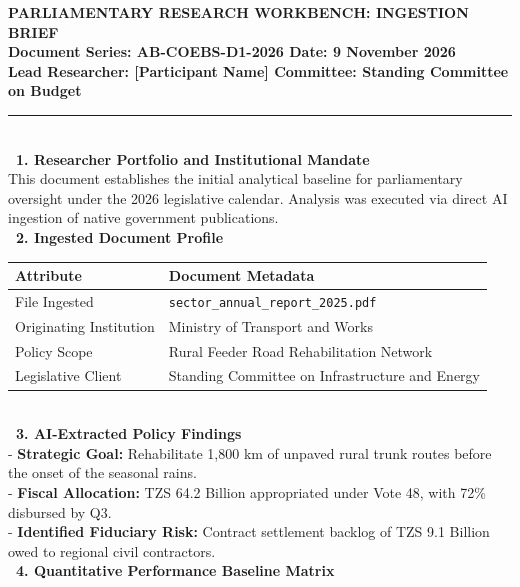 \documentclass[11pt, a4paper]{report}
\begin{document}
\begin{tcolorbox}[colback=lightgrey, colframe=bordergrey, title=\textbf{Deliverable 1 Preview: \texttt{Day1\_Ingestion\_Brief.md}}]
\small
\textcolor{tanzaniablue}{\textbf{PARLIAMENTARY RESEARCH WORKBENCH: INGESTION BRIEF}}\\
\textbf{\textcolor{tanzaniablue}{Document Series:} AB-COEBS-D1-2026 \quad \textbar{} \quad \textcolor{tanzaniablue}{\textbf{Date:}} 9 November 2026}\\
\textbf{\textcolor{tanzaniablue}{Lead Researcher:} [Participant Name] \quad \textbar{} \quad \textcolor{suagreen}{\textbf{Committee:}} Standing Committee on Budget}\\[0.2cm]
\rule{\textwidth}{0.4pt}\\[0.2cm]
\textcolor{tanzaniablue}{\textbf{\ 1. Researcher Portfolio and Institutional Mandate}}\\
This document establishes the initial analytical baseline for parliamentary oversight under the 2026 legislative calendar. Analysis was executed via direct AI ingestion of native government publications.\\[0.2cm]
\textcolor{tanzaniablue}{\textbf{\ 2. Ingested Document Profile}}\\
\begin{tabular}{ll}
\toprule
\textbf{Attribute} & \textbf{Document Metadata} \\
\midrule
File Ingested & \texttt{sector\_annual\_report\_2025.pdf} \\
Originating Institution & Ministry of Transport and Works \\
Policy Scope & Rural Feeder Road Rehabilitation Network \\
Legislative Client & Standing Committee on Infrastructure and Energy \\
\bottomrule
\end{tabular}\\[0.2cm]
\textcolor{tanzaniablue}{\textbf{\ 3. AI-Extracted Policy Findings}}\\
- \textbf{Strategic Goal:} Rehabilitate 1,800 km of unpaved rural trunk routes before the onset of the seasonal rains.\\
- \textbf{Fiscal Allocation:} TZS 64.2 Billion appropriated under Vote 48, with 72\% disbursed by Q3.\\
- \textbf{Identified Fiduciary Risk:} Contract settlement backlog of TZS 9.1 Billion owed to regional civil contractors.\\[0.2cm]
\textcolor{tanzaniablue}{\textbf{\ 4. Quantitative Performance Baseline Matrix}}\\

\end{tcolorbox}
\end{document}
